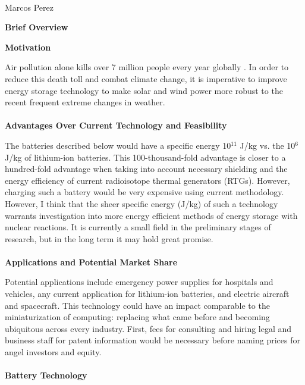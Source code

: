 \documentclass[12pt]{article}
\begin{document}
\begin{center}
   \\
   Marcos Perez
\end{center}
\begin{comment}
    What do I want them to walk away with? \\
    Nuclear reactions 
\end{comment}
\textbf{Brief Overview}\par

\textbf{Motivation}\par
Air pollution alone kills over 7 million people every year globally \cite{mannucci_novel_2019, noauthor_compendium_nodate, nansai_consumption_2021}. 
In order to reduce this death toll and combat climate change, it is imperative to improve energy storage technology to make solar and wind power more robust to the recent frequent extreme changes in weather.
\\ \\ \textbf{Advantages Over Current Technology and Feasibility}\par
The batteries described below would have a specific energy 10$^{11}$ J/kg vs. the 10$^6$ J/kg of lithium-ion batteries. This 100-thousand-fold advantage is closer to a hundred-fold advantage when taking into account necessary shielding and the energy efficiency of current radioisotope thermal generators (RTGs). However, charging such a battery would be very expensive using current methodology. However, I think that the sheer specific energy (J/kg) of such a technology warrants investigation into more energy efficient methods of energy storage with nuclear reactions. It is currently a small field in the preliminary stages of research, but in the long term it may hold great promise.
\\ \\ \textbf{Applications and Potential Market Share}\par 
Potential applications include emergency power supplies for hospitals and vehicles, any current application for lithium-ion batteries, and electric aircraft and spacecraft. This technology could have an impact comparable to the miniaturization of computing: replacing what came before and becoming ubiquitous across every industry. First, fees for consulting and hiring legal and business staff for patent information would be necessary before naming prices for angel investors and equity. 
\\ \\ \textbf{Battery Technology}\par
\end{document}
